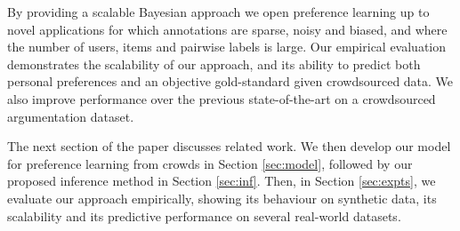 By providing a scalable Bayesian approach we open preference learning up to novel applications
for which annotations are sparse, noisy and biased, and where the number of users, items and pairwise labels is large.
Our empirical evaluation demonstrates the scalability of our approach,
and its ability to predict both personal preferences and an objective gold-standard given crowdsourced data.
We also improve performance over the previous state-of-the-art \citep{simpson2018finding} on a crowdsourced argumentation dataset.

The next section of the paper discusses related work.
We then develop our model for preference learning from crowds in Section \ref{sec:model},
followed by our proposed inference method in Section \ref{sec:inf}.
Then, in Section \ref{sec:expts}, 
we evaluate our approach empirically, showing its behaviour on synthetic data, 
its scalability and its predictive performance on several real-world datasets.

